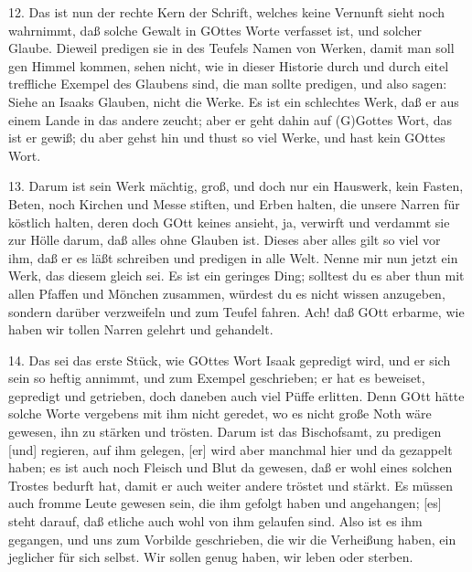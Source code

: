 12. Das ist nun der rechte Kern der Schrift, welches keine Vernunft sieht noch wahrnimmt, daß solche Gewalt in GOttes Worte verfasset ist, und solcher Glaube. Dieweil predigen sie in des Teufels Namen von Werken, damit man soll gen Himmel kommen, sehen nicht, wie in dieser Historie durch und durch eitel treffliche Exempel des Glaubens sind, die man sollte predigen, und also sagen: Siehe an Isaaks Glauben, nicht die Werke. Es ist ein schlechtes Werk, daß er aus einem Lande in das andere zeucht; aber er geht dahin auf (G)Gottes Wort, das ist er gewiß; du aber gehst hin und thust so viel Werke, und hast kein GOttes Wort.

13. Darum ist sein Werk mächtig, groß, und doch nur ein Hauswerk, kein Fasten, Beten, noch Kirchen und Messe stiften, und Erben halten, die unsere Narren für köstlich halten, deren doch GOtt keines ansieht, ja, verwirft und verdammt sie zur Hölle darum, daß alles ohne Glauben ist. Dieses aber alles gilt so viel vor ihm, daß er es läßt schreiben und predigen in alle Welt. Nenne mir nun jetzt ein Werk, das diesem gleich sei. Es ist ein geringes Ding; solltest du es aber thun mit allen Pfaffen und Mönchen zusammen, würdest du es nicht wissen anzugeben, sondern darüber verzweifeln und zum Teufel fahren. Ach! daß GOtt erbarme, wie haben wir tollen Narren gelehrt und gehandelt.

14. Das sei das erste Stück, wie GOttes Wort Isaak gepredigt wird, und er sich sein so heftig annimmt, und zum Exempel geschrieben; er hat es beweiset, gepredigt und getrieben, doch daneben auch viel Püffe erlitten. Denn GOtt hätte solche Worte vergebens mit ihm nicht geredet, wo es nicht große Noth wäre gewesen, ihn zu stärken und trösten. Darum ist das Bischofsamt, zu predigen [und] regieren, auf ihm gelegen, [er] wird aber manchmal hier und da gezappelt haben; es ist auch noch Fleisch und Blut da gewesen, daß er wohl eines solchen Trostes bedurft hat, damit er auch weiter andere tröstet und stärkt. Es müssen auch fromme Leute gewesen sein, die ihm gefolgt haben und angehangen; [es] steht darauf, daß etliche auch wohl von ihm gelaufen sind. Also ist es ihm gegangen, und uns zum Vorbilde geschrieben, die wir die Verheißung haben, ein jeglicher für sich selbst. Wir sollen genug haben, wir leben oder sterben.


